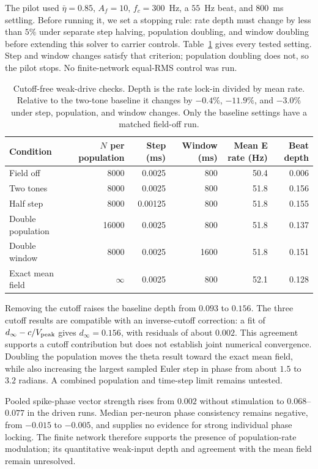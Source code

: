 \documentclass[11pt,a4paper]{article}
\begin{document}
The pilot used $\bar\eta=0.85$, $A_f=10$, $f_c=300$~Hz, a $55$~Hz beat,
and $800$~ms settling. Before running it, we set a stopping rule: rate depth
must change by less than $5\%$ under separate step halving, population
doubling, and window doubling before extending this solver to carrier controls.
Table~\ref{tab:theta-pilot} gives every tested setting. Step and window changes
satisfy that criterion; population doubling does not, so the pilot stops.
No finite-network equal-RMS control was run.

\begin{table}[htbp]
\centering\small
\begin{tabular}{@{}lrrrrr@{}}
\toprule
Condition & $N$ per population & Step (ms) & Window (ms) & Mean E rate (Hz) & Beat depth\\
\midrule
Field off & 8000 & 0.0025 & 800 & 50.4 & 0.006\\
Two tones & 8000 & 0.0025 & 800 & 51.8 & 0.156\\
Half step & 8000 & 0.00125 & 800 & 51.8 & 0.155\\
Double population & 16000 & 0.0025 & 800 & 51.8 & 0.137\\
Double window & 8000 & 0.0025 & 1600 & 51.8 & 0.151\\
Exact mean field & $\infty$ & 0.0025 & 800 & 52.1 & 0.128\\
\bottomrule
\end{tabular}
\caption{Cutoff-free weak-drive checks. Depth is the rate lock-in divided by
mean rate. Relative to the two-tone baseline it changes by $-0.4\%$,
$-11.9\%$, and $-3.0\%$ under step, population, and window changes.
Only the baseline settings have a matched field-off run.}
\label{tab:theta-pilot}
\end{table}

Removing the cutoff raises the baseline depth from $0.093$ to $0.156$.
The three cutoff results are compatible with an inverse-cutoff correction:
a fit of $d_\infty-c/V_{\rm peak}$ gives $d_\infty=0.156$, with residuals
of about $0.002$. This agreement supports a cutoff contribution but does not
establish joint numerical convergence. Doubling the population moves the
theta result toward the exact mean field, while also increasing the largest
sampled Euler step in phase from about $1.5$ to $3.2$ radians. A combined
population and time-step limit remains untested.

Pooled spike-phase vector strength rises from $0.002$ without stimulation
to $0.068$--$0.077$ in the driven runs. Median per-neuron phase consistency
remains negative, from $-0.015$ to $-0.005$, and supplies no evidence for
strong individual phase locking. The finite network therefore supports the
presence of population-rate modulation; its quantitative weak-input depth
and agreement with the mean field remain unresolved.
\end{document}
